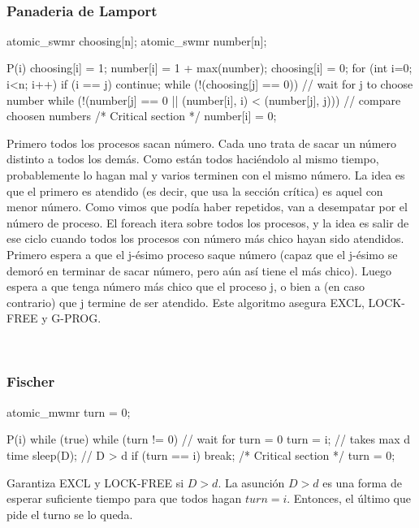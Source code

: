 \documentclass{article}
\begin{document}
~

\subsubsection{Panaderia de Lamport}

\begin{code}
 atomic_swmr choosing[n];
 atomic_swmr number[n];
 
 P(i) {
    choosing[i] = 1;
    number[i] = 1 + max(number);
    choosing[i] = 0;
    for (int i=0; i<n; i++) {
        if (i == j)
            continue;
        while (!(choosing[j] == 0)) {}           // wait for j to choose number
        while (!(number[j] == 0 ||
            (number[i], i) < (number[j], j))) {} // compare choosen numbers
    }
    /* Critical section */
    number[i] = 0;
 }
 
\end{code}

Primero todos los procesos sacan número. Cada uno trata de sacar un número distinto a todos los demás. Como están todos haciéndolo al mismo tiempo, probablemente lo hagan mal y varios terminen con el mismo número.
La idea es que el primero es atendido (es decir, que usa la sección crítica) es aquel con menor número. Como vimos que podía haber repetidos, van a desempatar por el número de proceso. El foreach itera sobre todos los procesos, y la idea es salir de ese ciclo cuando todos los procesos con número más chico hayan sido atendidos. Primero espera a que el j-ésimo proceso saque número (capaz que el j-ésimo se demoró en terminar de sacar número, pero aún así tiene el más chico).
Luego espera a que tenga número más chico que el proceso j, o bien a (en caso contrario) que j termine de ser atendido. Este algoritmo asegura EXCL, LOCK-FREE y G-PROG.

~

\subsubsection{Fischer}
\begin{code}
 atomic_mwmr turn = 0;
 
 P(i) {
    while (true) {
        while (turn != 0) {} // wait for turn = 0
        turn = i;            // takes max d time
        sleep(D);            // D > d
        if (turn == i)
            break;
    }
    /* Critical section */
    turn = 0;
 }
\end{code}

Garantiza EXCL y LOCK-FREE si $D > d$. La asunción $D > d$ es una forma de esperar suficiente tiempo para que todos hagan $turn = i$. Entonces, el último que pide el turno se lo queda.
\end{document}
